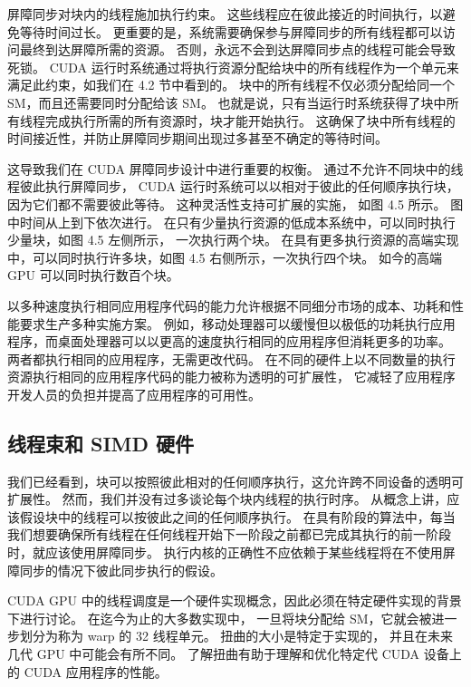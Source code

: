 屏障同步对块内的线程施加执行约束。 这些线程应在彼此接近的时间执行，以避免等待时间过长。 
更重要的是，系统需要确保参与屏障同步的所有线程都可以访问最终到达屏障所需的资源。 
否则，永远不会到达屏障同步点的线程可能会导致死锁。 
CUDA 运行时系统通过将执行资源分配给块中的所有线程作为一个单元来满足此约束，如我们在 4.2 节中看到的。 
块中的所有线程不仅必须分配给同一个 SM，而且还需要同时分配给该 SM。 
也就是说，只有当运行时系统获得了块中所有线程完成执行所需的所有资源时，块才能开始执行。 
这确保了块中所有线程的时间接近性，并防止屏障同步期间出现过多甚至不确定的等待时间。

这导致我们在 CUDA 屏障同步设计中进行重要的权衡。 通过不允许不同块中的线程彼此执行屏障同步，
CUDA 运行时系统可以以相对于彼此的任何顺序执行块，因为它们都不需要彼此等待。 这种灵活性支持可扩展的实施，
如图 4.5 所示。 图中时间从上到下依次进行。 在只有少量执行资源的低成本系统中，可以同时执行少量块，如图 4.5 左侧所示，
一次执行两个块。 在具有更多执行资源的高端实现中，可以同时执行许多块，如图 4.5 右侧所示，一次执行四个块。 
如今的高端 GPU 可以同时执行数百个块。

以多种速度执行相同应用程序代码的能力允许根据不同细分市场的成本、功耗和性能要求生产多种实施方案。 
例如，移动处理器可以缓慢但以极低的功耗执行应用程序，而桌面处理器可以以更高的速度执行相同的应用程序但消耗更多的功率。 
两者都执行相同的应用程序，无需更改代码。 
在不同的硬件上以不同数量的执行资源执行相同的应用程序代码的能力被称为透明的可扩展性，
它减轻了应用程序开发人员的负担并提高了应用程序的可用性。

\subsection{线程束和 SIMD 硬件}
我们已经看到，块可以按照彼此相对的任何顺序执行，这允许跨不同设备的透明可扩展性。 
然而，我们并没有过多谈论每个块内线程的执行时序。 从概念上讲，应该假设块中的线程可以按彼此之间的任何顺序执行。 
在具有阶段的算法中，每当我们想要确保所有线程在任何线程开始下一阶段之前都已完成其执行的前一阶段时，就应该使用屏障同步。 
执行内核的正确性不应依赖于某些线程将在不使用屏障同步的情况下彼此同步执行的假设。

CUDA GPU 中的线程调度是一个硬件实现概念，因此必须在特定硬件实现的背景下进行讨论。 在迄今为止的大多数实现中，
一旦将块分配给 SM，它就会被进一步划分为称为 warp 的 32 线程单元。 扭曲的大小是特定于实现的，
并且在未来几代 GPU 中可能会有所不同。 了解扭曲有助于理解和优化特定代 CUDA 设备上的 CUDA 应用程序的性能。

